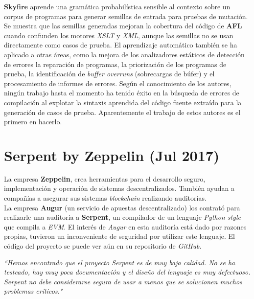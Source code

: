 \textbf{Skyfire}\cite{Wang:Chen:Wei:Liu:Skyfire} aprende una gramática probabilística sensible al contexto sobre un corpus de programas para generar semillas de entrada para pruebas de mutación. Se muestra que las semillas generadas mejoran la cobertura del código de \textbf{AFL}\cite{AFL} cuando confunden los motores \textit{XSLT} y \textit{XML}, aunque las semillas no se usan directamente como casos de prueba. El aprendizaje automático también se ha aplicado a otras áreas, como la mejora de los analizadores estáticos de detección de errores \cite{Heo:Oh:Yi:Unsound}\cite{Koc:Saadatpanah:Jeffrey:Porter:False} la reparación de programas\cite{Koukoutos:Raghothaman:Kneuss:Kuncak}\cite{White:Tufano:Martinez:Monperrus}, la priorización de los programas de prueba\cite{Chen:Bai:Hao:Xiong:Zhang}, la identificación de \textit{buffer overruns} (sobrecargas de búfer)\cite{Choi:Jeong:Oh:Choo:BufferOverruns} y el procesamiento de informes de errores\cite{Xuan:Ming:Buggy}\cite{Lam:Anh:Nguyen:Nguyen:DeepLearning}. Según el conocimiento de los autores, ningún trabajo hasta el momento ha tenido éxito en la búsqueda de errores de compilación al explotar la sintaxis aprendida del código fuente extraído para la generación de casos de prueba. Aparentemente el trabajo de estos autores es el primero en hacerlo.

\section{Serpent by Zeppelin (Jul 2017)}

La empresa \textbf{Zeppelin}, crea herramientas para el desarrollo seguro, implementación y operación de sistemas descentralizados. También ayudan a compañías a asegurar sus sistemas \textit{blockchain} realizando auditorías.\\

La empresa \textbf{Augur} (un servicio de apuestas descentralizado) los contrató para realizarle una auditoría a \textbf{Serpent}, un compilador de un lenguaje \textit{Python-style} que compila a \textit{EVM}. El interés de \textit{Augur} en esta auditoría está dado por razones propias, tuvieron un inconveniente de seguridad por utilizar este lenguaje. El código del proyecto se puede ver aún en su repositorio de \textit{GitHub}\cite{SerpentRepository}.\\

\begin{displayquote}
    \textit{``Hemos encontrado que el proyecto Serpent es de muy baja calidad. No se ha testeado, hay muy poca documentación y el diseño del lenguaje es muy defectuoso. Serpent no debe considerarse segura de usar a menos que se solucionen muchos problemas críticos."}
\end{displayquote}

